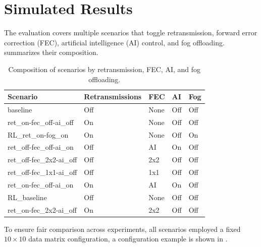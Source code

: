 \section{Simulated Results}
\label{sec:simulated results}

\quad The evaluation covers multiple scenarios that toggle retransmission, forward error correction (FEC), artificial intelligence (AI) control, and fog offloading. \textbf{} summarizes their composition. 

\begin{table}[H]
	\centering
	\begin{tabular}{lllll}
		\textbf{Scenario}             & \textbf{Retransmissions} & \textbf{FEC}    & \textbf{AI} & \textbf{Fog} \\
		\hline
		baseline                      & Off                      & None            & Off         & Off          \\
		ret\_on-fec\_off-ai\_off      & On                       & None            & Off         & Off          \\
		RL\_ret\_on-fog\_on           & On                       & None            & Off         & On           \\
		ret\_off-fec\_off-ai\_on      & Off                      & AI              & On          & Off          \\
		ret\_off-fec\_2x2-ai\_off     & Off                      & 2x2             & Off         & Off          \\
		ret\_off-fec\_1x1-ai\_off     & Off                      & 1x1             & Off         & Off          \\
		ret\_on-fec\_off-ai\_on       & On                       & AI              & On          & Off          \\
		RL\_baseline                  & Off                      & None            & Off         & Off          \\
		ret\_on-fec\_2x2-ai\_off      & On                       & 2x2             & Off         & Off         
	\end{tabular}
	\caption{Composition of scenarios by retransmission, FEC, AI, and fog offloading.}
	\label{tab:scenarios}
\end{table}

\quad To ensure fair comparison across experiments, all scenarios employed a fixed \(10 \times 10\) data matrix configuration, a \textbf{} configuration example is shown in \textbf{}.  


